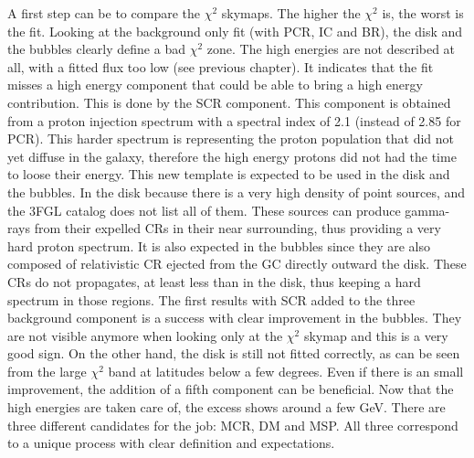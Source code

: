 A first step can be to compare the $\chi^2$ skymaps. The higher the $\chi^2$ is, the worst is the fit. Looking at the background only fit (with PCR, IC and BR), the disk and the bubbles clearly define a bad $\chi^2$ zone. The high energies are not described at all, with a fitted flux too low (see previous chapter). It indicates that the fit misses a high energy component that could be able to bring a high energy contribution. This is done by the SCR component. This component is obtained from a proton injection spectrum with a spectral index of 2.1 (instead of 2.85 for PCR). This harder spectrum is representing the proton population that did not yet diffuse in the galaxy, therefore the high energy protons did not had the time to loose their energy. This new template is expected to be used in the disk and the bubbles. In the disk because there is a very high density of point sources, and the 3FGL catalog does not list all of them. These sources can produce gamma-rays from their expelled CRs in their near surrounding, thus providing a very hard proton spectrum. It is also expected in the bubbles since they are also composed of relativistic CR ejected from the GC directly outward the disk. These CRs do not propagates, at least less than in the disk, thus keeping a hard spectrum in those regions. 
The first results with SCR added to the three background component is a success with clear improvement in the bubbles. They are not visible anymore when looking only at the $\chi^2$ skymap and this is a very good sign. On the other hand, the disk is still not fitted correctly, as can be seen from the large $\chi^2$ band at latitudes below a few degrees. Even if there is an small improvement, the addition of a fifth component can be beneficial.
Now that the high energies are taken care of, the excess shows around a few GeV. There are three different candidates for the job: MCR, DM and MSP. All three correspond to a unique process with clear definition and expectations.

